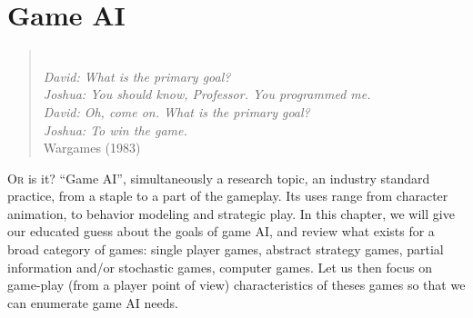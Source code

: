 \chapter{Game AI}


\begin{verse}\textit{
\\
David: What is the primary goal?\\
Joshua: You should know, Professor. You programmed me.\\
David: Oh, come on. What is the primary goal?\\
Joshua: To win the game.\\
} Wargames (1983)\end{verse}
\lettrine{O}{r}
 is it? ``Game AI'', simultaneously a research topic, an industry standard practice, from a staple to a part of the gameplay. Its uses range from character animation, to behavior modeling and strategic play. In this chapter, we will give our educated guess about the goals of game AI, and review what exists for a broad category of games: single player games, abstract strategy games, partial information and/or stochastic games, computer games. Let us then focus on game-play (from a player point of view) characteristics of theses games so that we can enumerate game AI needs. %

